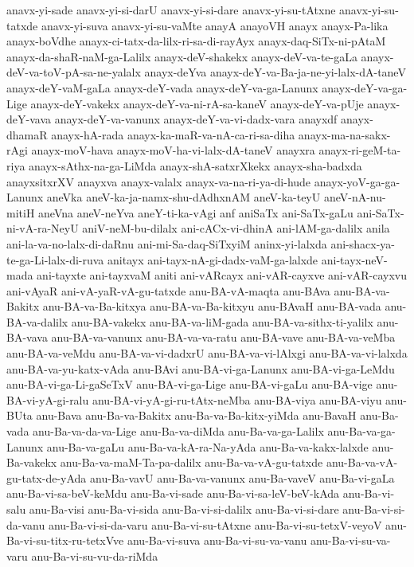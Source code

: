 {anavx-yi-sade
anavx-yi-si-darU
anavx-yi-si-dare
anavx-yi-su-tAtxne
anavx-yi-su-tatxde
anavx-yi-suva
anavx-yi-su-vaMte
anayA
anayoVH
anayx
anayx-Pa-lika
anayx-boVdhe
anayx-ci-tatx-da-lilx-ri-sa-di-rayAyx
anayx-daq-SiTx-ni-pAtaM
anayx-da-shaR-naM-ga-Lalilx
anayx-deV-shakekx
anayx-deV-va-te-gaLa
anayx-deV-va-toV-pA-sa-ne-yalalx
anayx-deYva
anayx-deY-va-Ba-ja-ne-yi-lalx-dA-taneV
anayx-deY-vaM-gaLa
anayx-deY-vada
anayx-deY-va-ga-Lanunx
anayx-deY-va-ga-Lige
anayx-deY-vakekx
anayx-deY-va-ni-rA-sa-kaneV
anayx-deY-va-pUje
anayx-deY-vava
anayx-deY-va-vanunx
anayx-deY-va-vi-dadx-vara
anayxdf
anayx-dhamaR
anayx-hA-rada
anayx-ka-maR-va-nA-ca-ri-sa-diha
anayx-ma-na-sakx-rAgi
anayx-moV-hava
anayx-moV-ha-vi-lalx-dA-taneV
anayxra
anayx-ri-geM-ta-riya
anayx-sAthx-na-ga-LiMda
anayx-shA-satxrXkekx
anayx-sha-badxda
anayxsitxrXV
anayxva
anayx-valalx
anayx-va-na-ri-ya-di-hude
anayx-yoV-ga-ga-Lanunx
aneVka
aneV-ka-ja-namx-shu-dAdhxnAM
aneV-ka-teyU
aneV-nA-nu-mitiH
aneVna
aneV-neYva
aneY-ti-ka-vAgi
anf
aniSaTx
ani-SaTx-gaLu
ani-SaTx-ni-vA-ra-NeyU
aniV-neM-bu-dilalx
ani-cACx-vi-dhinA
ani-lAM-ga-dalilx
anila
ani-la-va-no-lalx-di-daRnu
ani-mi-Sa-daq-SiTxyiM
aninx-yi-lalxda
ani-shacx-ya-te-ga-Li-lalx-di-ruva
anitayx
ani-tayx-nA-gi-dadx-vaM-ga-lalxde
ani-tayx-neV-mada
ani-tayxte
ani-tayxvaM
aniti
ani-vARcayx
ani-vAR-cayxve
ani-vAR-cayxvu
ani-vAyaR
ani-vA-yaR-vA-gu-tatxde
anu-BA-vA-maqta
anu-BAva
anu-BA-va-Bakitx
anu-BA-va-Ba-kitxya
anu-BA-va-Ba-kitxyu
anu-BAvaH
anu-BA-vada
anu-BA-va-dalilx
anu-BA-vakekx
anu-BA-va-liM-gada
anu-BA-va-sithx-ti-yalilx
anu-BA-vava
anu-BA-va-vanunx
anu-BA-va-va-ratu
anu-BA-vave
anu-BA-va-veMba
anu-BA-va-veMdu
anu-BA-va-vi-dadxrU
anu-BA-va-vi-lAlxgi
anu-BA-va-vi-lalxda
anu-BA-va-yu-katx-vAda
anu-BAvi
anu-BA-vi-ga-Lanunx
anu-BA-vi-ga-LeMdu
anu-BA-vi-ga-Li-gaSeTxV
anu-BA-vi-ga-Lige
anu-BA-vi-gaLu
anu-BA-vige
anu-BA-vi-yA-gi-ralu
anu-BA-vi-yA-gi-ru-tAtx-neMba
anu-BA-viya
anu-BA-viyu
anu-BUta
anu-Bava
anu-Ba-va-Bakitx
anu-Ba-va-Ba-kitx-yiMda
anu-BavaH
anu-Ba-vada
anu-Ba-va-da-va-Lige
anu-Ba-va-diMda
anu-Ba-va-ga-Lalilx
anu-Ba-va-ga-Lanunx
anu-Ba-va-gaLu
anu-Ba-va-kA-ra-Na-yAda
anu-Ba-va-kakx-lalxde
anu-Ba-vakekx
anu-Ba-va-maM-Ta-pa-dalilx
anu-Ba-va-vA-gu-tatxde
anu-Ba-va-vA-gu-tatx-de-yAda
anu-Ba-vavU
anu-Ba-va-vanunx
anu-Ba-vaveV
anu-Ba-vi-gaLa
anu-Ba-vi-sa-beV-keMdu
anu-Ba-vi-sade
anu-Ba-vi-sa-leV-beV-kAda
anu-Ba-vi-salu
anu-Ba-visi
anu-Ba-vi-sida
anu-Ba-vi-si-dalilx
anu-Ba-vi-si-dare
anu-Ba-vi-si-da-vanu
anu-Ba-vi-si-da-varu
anu-Ba-vi-su-tAtxne
anu-Ba-vi-su-tetxV-veyoV
anu-Ba-vi-su-titx-ru-tetxVve
anu-Ba-vi-suva
anu-Ba-vi-su-va-vanu
anu-Ba-vi-su-va-varu
anu-Ba-vi-su-vu-da-riMda
}
